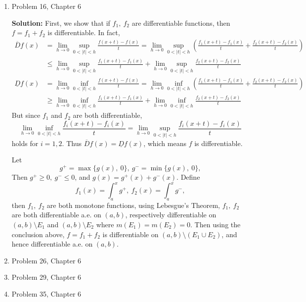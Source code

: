 \documentclass{article}%
\begin{document}
\begin{enumerate}
\bigskip
\item  Problem 16, Chapter 6

\smallskip
\textbf{Solution:}
\smallskip
First, we show that if $f_1, ~f_2$ are differentiable functions, then $f = f_1+f_2$ is differentiable. In fact,
$$
\begin{aligned}
\overline{D}f(x) &= \lim_{h\to 0}\sup_{0 < |t| < h}\frac{f(x+t)-f(x)}{t} = \lim_{h\to 0}\sup_{0 < |t| < h}(\frac{f_1(x+t)-f_1(x)}{t}+\frac{f_2(x+t)-f_2(x)}{t}) \\
&\le \lim_{h\to 0}\sup_{0 < |t| < h}\frac{f_1(x+t)-f_1(x)}{t} + \lim_{h\to 0}\sup_{0 < |t| < h}\frac{f_2(x+t)-f_2(x)}{t}
\end{aligned}
$$
$$
\begin{aligned}
\underline{D}f(x) &= \lim_{h\to 0}\inf_{0 < |t| < h}\frac{f(x+t)-f(x)}{t} = \lim_{h\to 0}\inf_{0 < |t| < h}(\frac{f_1(x+t)-f_1(x)}{t}+\frac{f_2(x+t)-f_2(x)}{t}) \\
&\ge \lim_{h\to 0}\inf_{0 < |t| < h}\frac{f_1(x+t)-f_1(x)}{t} + \lim_{h\to 0}\inf_{0 < |t| < h}\frac{f_2(x+t)-f_2(x)}{t}
\end{aligned}
$$
But since $f_1$ and $f_2$ are both differentiable, 
$$
\lim_{h\to 0}\inf_{0 < |t| < h}\frac{f_i(x+t)-f_i(x)}{t} = \lim_{h\to 0}\sup_{0 < |t| < h}\frac{f_i(x+t)-f_i(x)}{t}
$$
holds for $i = 1, 2$. Thus $\overline{D}f(x) = \underline{D}f(x)$, which means $f$ is differentiable.

Let
$$
g^+ = \max\{g(x), ~0\}, ~g^- = \min\{g(x), ~0\},
$$
Then $g^+ \ge 0, ~g^- \le 0$, and $g(x) = g^+(x) + g^-(x)$. Define
$$
f_1(x) = \int_{a}^{x}g^+, ~f_2(x) = \int_{a}^{x}g^-,
$$
then $f_1, ~f_2$ are both monotone functions, using Lebesgue's Theorem, $f_1, ~f_2 $ are both differentiable a.e. on $(a, b)$, respectively differentiable on $(a, b)\setminus E_1 $ and $(a, b) \setminus E_2 $ where $m(E_1) = m(E_2) = 0$. Then using the conclusion above, $f = f_1 + f_2 $ is differentiable on $(a, b)\setminus (E_1\cup E_2)$, and hence differentiable a.e. on $(a, b)$.





\item  Problem 26, Chapter 6
\item  Problem 29, Chapter 6
\item  Problem 35, Chapter 6

\end{enumerate}
\end{document}
